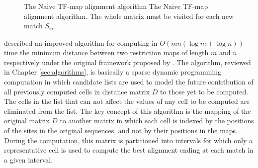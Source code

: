 \begin{figure}[t!]
\begin{center}
          {The Naive TF-map alignment algorithm}%
          {The Naive TF-map alignment algorithm.}%
          {The whole matrix must be visited for each new match $S_{ij}$}
\end{center}
\end{figure}


 
\citet{myers:1992a} described an improved algorithm for computing in
$O(mn(\log m + \log n))$ time the minimum distance between two
restriction maps of length $m$ and $n$ respectively under the original
framework proposed by \citet{waterman:1984a}. The algorithm, reviewed
in Chapter \ref{sec:algorithms}, is basically a sparse dynamic programming 
computation in which candidate lists are used to model the future contribution 
of all previously computed cells in distance matrix $D$ to those yet to be computed.
The cells in the list that can not affect the values of any cell to be
computed are eliminated from the list. The key concept of this
algorithm is the mapping of the original matrix $D$ to another matrix
in which each cell is indexed by the positions of the sites in 
the original sequences, and not by their positions in the maps. 
During the computation, this matrix is partitioned into intervals for which
only a representative cell is used to compute the best alignment
ending at each match in a given interval.

